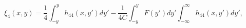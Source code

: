 \begin{equation}\label{xi4}
\xi_4(x,y)=\frac{1}{4}\int_{-y}^y h_{44} (x,y') dy' -\frac{1}{4C}
\int_{-y}^y F(y') dy' \int_{-\infty}^{\infty} h_{44} (x,y') dy',
\end{equation}

